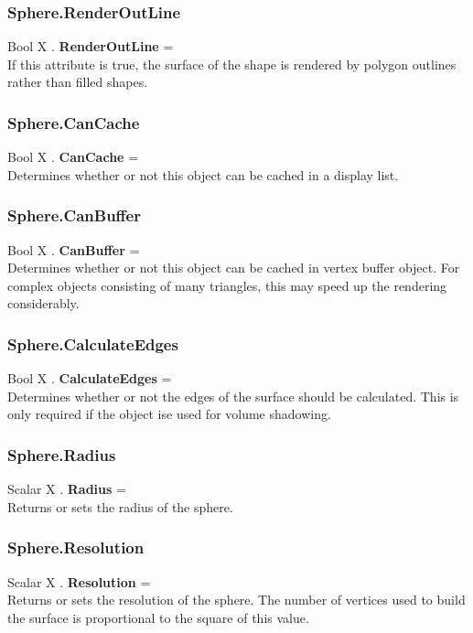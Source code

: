 \subsubsection{Sphere.RenderOutLine \label{F:Sphere:RenderOutLine}}
Bool X . \textbf{RenderOutLine} = \\
If this attribute is true, the surface of the shape is rendered by polygon outlines rather than filled shapes.

\subsubsection{Sphere.CanCache \label{F:Sphere:CanCache}}
Bool X . \textbf{CanCache} = \\
Determines whether or not this object can be cached in a display list.

\subsubsection{Sphere.CanBuffer \label{F:Sphere:CanBuffer}}
Bool X . \textbf{CanBuffer} = \\
Determines whether or not this object can be cached in vertex buffer object. For complex objects consisting of many triangles, this may speed up the rendering considerably.

\subsubsection{Sphere.CalculateEdges \label{F:Sphere:CalculateEdges}}
Bool X . \textbf{CalculateEdges} = \\
Determines whether or not the edges of the surface should be calculated. This is only required if the object ise used for volume shadowing.

\subsubsection{Sphere.Radius \label{F:Sphere:Radius}}
Scalar X . \textbf{Radius} = \\
Returns or sets the radius of the sphere.

\subsubsection{Sphere.Resolution \label{F:Sphere:Resolution}}
Scalar X . \textbf{Resolution} = \\
Returns or sets the resolution of the sphere. The number of vertices used to build the surface is proportional to the square of this value.

